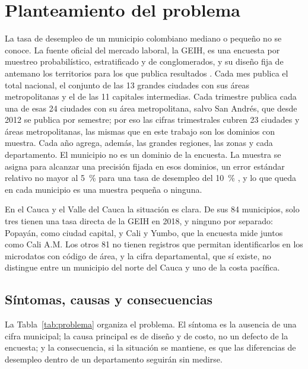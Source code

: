 \label{sec:problema}

\section{Planteamiento del problema}
\label{sec:planteamiento}

La tasa de desempleo de un municipio colombiano mediano o pequeño no se conoce. La fuente oficial del mercado laboral, la GEIH, es una encuesta por muestreo probabilístico, estratificado y de conglomerados, y su diseño fija de antemano los territorios para los que publica resultados \cite[pp.~9--10]{DANE_GEIH_Metodologia2016}. Cada mes publica el total nacional, el conjunto de las 13 grandes ciudades con sus áreas metropolitanas y el de las 11 capitales intermedias. Cada trimestre publica cada una de esas 24 ciudades con su área metropolitana, salvo San Andrés, que desde 2012 se publica por semestre; por eso las cifras trimestrales cubren 23 ciudades y áreas metropolitanas, las mismas que en este trabajo son los dominios con muestra. Cada año agrega, además, las grandes regiones, las zonas y cada departamento. El municipio no es un dominio de la encuesta. La muestra se asigna para alcanzar una precisión fijada en esos dominios, un error estándar relativo no mayor al 5~\% para una tasa de desempleo del 10~\% \cite[p.~12]{DANE_GEIH_Metodologia2016}, y lo que queda en cada municipio es una muestra pequeña o ninguna.

En el Cauca y el Valle del Cauca la situación es clara. De sus 84 municipios, solo tres tienen una tasa directa de la GEIH en 2018, y ninguno por separado: Popayán, como ciudad capital, y Cali y Yumbo, que la encuesta mide juntos como Cali A.M. Los otros 81 no tienen registros que permitan identificarlos en los microdatos con código de área, y la cifra departamental, que sí existe, no distingue entre un municipio del norte del Cauca y uno de la costa pacífica.

\subsection{Síntomas, causas y consecuencias}

La Tabla~\ref{tab:problema} organiza el problema. El síntoma es la ausencia de una cifra municipal; la causa principal es de diseño y de costo, no un defecto de la encuesta; y la consecuencia, si la situación se mantiene, es que las diferencias de desempleo dentro de un departamento seguirán sin medirse.

